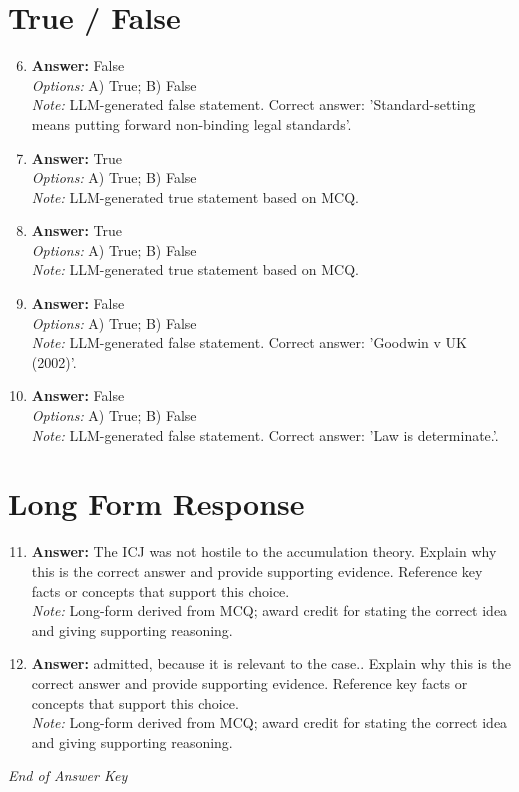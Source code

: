 \documentclass[12pt]{article}
\begin{document}
\section*{True / False}
\begin{enumerate}[label=\arabic*.]
\setcounter{enumi}{5}
\item \textbf{Answer:} False
\\ \textit{Options:} A) True; B) False
\\ \textit{Note:} LLM-generated false statement. Correct answer: 'Standard-setting means putting forward non-binding legal standards'.
\item \textbf{Answer:} True
\\ \textit{Options:} A) True; B) False
\\ \textit{Note:} LLM-generated true statement based on MCQ.
\item \textbf{Answer:} True
\\ \textit{Options:} A) True; B) False
\\ \textit{Note:} LLM-generated true statement based on MCQ.
\item \textbf{Answer:} False
\\ \textit{Options:} A) True; B) False
\\ \textit{Note:} LLM-generated false statement. Correct answer: 'Goodwin v UK (2002)'.
\item \textbf{Answer:} False
\\ \textit{Options:} A) True; B) False
\\ \textit{Note:} LLM-generated false statement. Correct answer: 'Law is determinate.'.
\end{enumerate}

\section*{Long Form Response}
\begin{enumerate}[label=\arabic*.]
\setcounter{enumi}{10}
\item \textbf{Answer:} The ICJ was not hostile to the accumulation theory. Explain why this is the correct answer and provide supporting evidence. Reference key facts or concepts that support this choice.
\\ \textit{Note:} Long-form derived from MCQ; award credit for stating the correct idea and giving supporting reasoning.
\item \textbf{Answer:} admitted, because it is relevant to the case.. Explain why this is the correct answer and provide supporting evidence. Reference key facts or concepts that support this choice.
\\ \textit{Note:} Long-form derived from MCQ; award credit for stating the correct idea and giving supporting reasoning.
\end{enumerate}

\vfill
\noindent\textit{End of Answer Key}
\end{document}

